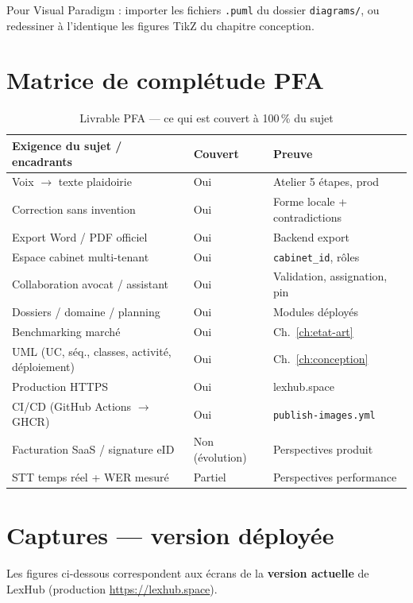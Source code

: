 Pour Visual Paradigm : importer les fichiers \texttt{.puml} du dossier \texttt{diagrams/}, ou redessiner à l'identique les figures TikZ du chapitre conception.

\chapter{Matrice de complétude PFA}
\label{ch:completude}

\begin{table}[H]
\centering
\caption{Livrable PFA --- ce qui est couvert à 100\,\% du sujet}
\label{tab:completude}
\small
\renewcommand{\arraystretch}{1.22}
\begin{tabular}{@{}p{5.5cm}p{2.2cm}p{5.0cm}@{}}
\toprule
\textbf{Exigence du sujet / encadrants} & \textbf{Couvert} & \textbf{Preuve} \\
\midrule
Voix $\rightarrow$ texte plaidoirie & Oui & Atelier 5 étapes, prod \\
Correction sans invention & Oui & Forme locale + contradictions \\
Export Word / PDF officiel & Oui & Backend export \\
Espace cabinet multi-tenant & Oui & \texttt{cabinet\_id}, rôles \\
Collaboration avocat / assistant & Oui & Validation, assignation, pin \\
Dossiers / domaine / planning & Oui & Modules déployés \\
Benchmarking marché & Oui & Ch.~\ref{ch:etat-art} \\
UML (UC, séq., classes, activité, déploiement) & Oui & Ch.~\ref{ch:conception} \\
Production HTTPS & Oui & lexhub.space \\
CI/CD (GitHub Actions $\rightarrow$ GHCR) & Oui & \texttt{publish-images.yml} \\
Facturation SaaS / signature eID & Non (évolution) & Perspectives produit \\
STT temps réel + WER mesuré & Partiel & Perspectives performance \\
\bottomrule
\end{tabular}
\end{table}

\chapter{Captures --- version déployée}
\label{ch:captures}

Les figures ci-dessous correspondent aux écrans de la \textbf{version actuelle} de LexHub (production \url{https://lexhub.space}).

